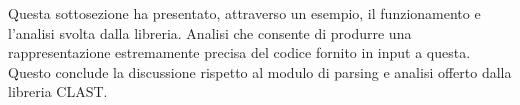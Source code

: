 Questa sottosezione ha presentato, attraverso un esempio, il funzionamento e
l’analisi svolta dalla libreria. Analisi che consente di produrre una
rappresentazione estremamente precisa del codice fornito in input a questa.
Questo conclude la discussione rispetto al modulo di parsing e analisi offerto
dalla libreria CLAST.
